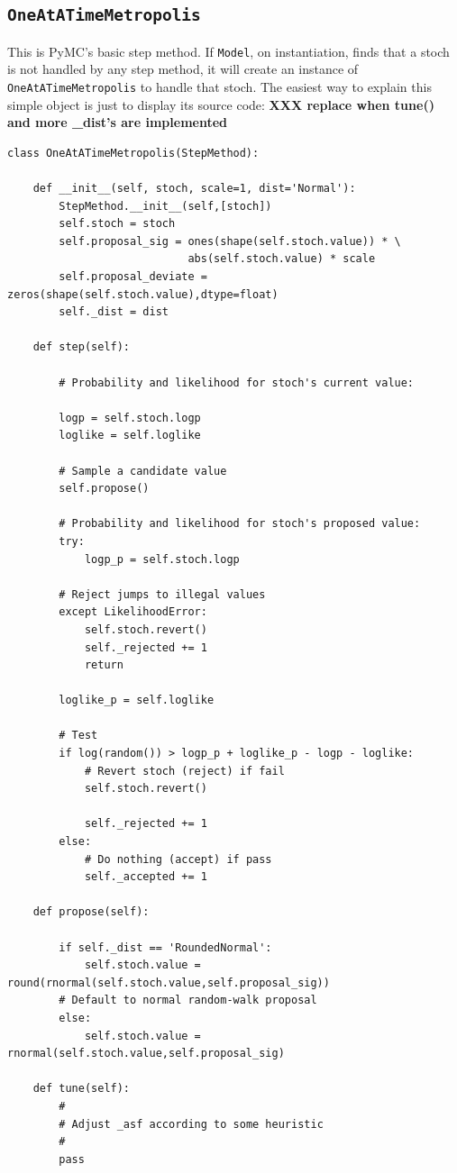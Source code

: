 \documentclass[]{book}
\begin{document}
\subsection{\texttt{OneAtATimeMetropolis}}\label{sub:OAATM}
This is PyMC's basic step method. If \texttt{Model}, on instantiation, finds that a stoch is not handled by any step method, it will create an instance of \texttt{OneAtATimeMetropolis} to handle that stoch. The easiest way to explain this simple object is just to display its source code: \textbf{XXX replace when tune() and more \_dist's are implemented}
\begin{verbatim}
class OneAtATimeMetropolis(StepMethod):

    def __init__(self, stoch, scale=1, dist='Normal'):
        StepMethod.__init__(self,[stoch])
        self.stoch = stoch
        self.proposal_sig = ones(shape(self.stoch.value)) * \
                            abs(self.stoch.value) * scale
        self.proposal_deviate = zeros(shape(self.stoch.value),dtype=float)
        self._dist = dist

    def step(self):

        # Probability and likelihood for stoch's current value:

        logp = self.stoch.logp
        loglike = self.loglike

        # Sample a candidate value
        self.propose()

        # Probability and likelihood for stoch's proposed value:
        try:
            logp_p = self.stoch.logp

        # Reject jumps to illegal values
        except LikelihoodError:
            self.stoch.revert()
            self._rejected += 1
            return

        loglike_p = self.loglike

        # Test
        if log(random()) > logp_p + loglike_p - logp - loglike:
            # Revert stoch (reject) if fail
            self.stoch.revert()

            self._rejected += 1
        else:
            # Do nothing (accept) if pass
            self._accepted += 1

    def propose(self):

        if self._dist == 'RoundedNormal':
            self.stoch.value = round(rnormal(self.stoch.value,self.proposal_sig))
        # Default to normal random-walk proposal
        else:
            self.stoch.value = rnormal(self.stoch.value,self.proposal_sig)

    def tune(self):
        #
        # Adjust _asf according to some heuristic
        #
        pass
\end{verbatim}
\end{document}
